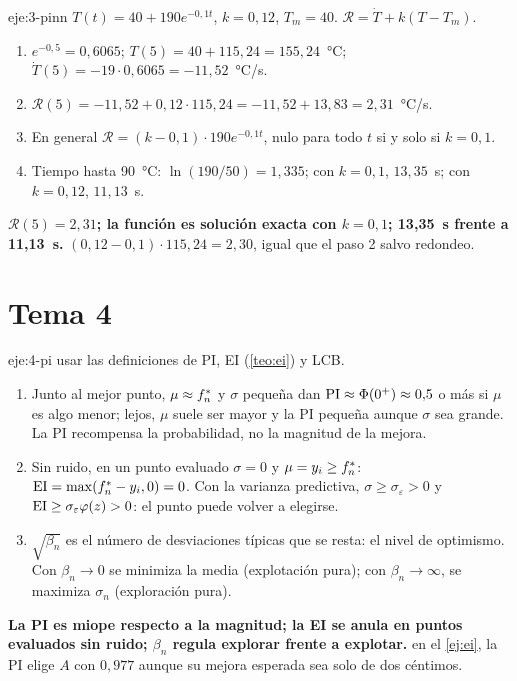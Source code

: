 \begin{solucion}{eje:3-pinn}
\datos $T(t)=40+190e^{-0{,}1t}$, $k=0{,}12$, $T_m=40$.
\planteamiento $\mathcal R=\dot T+k(T-T_m)$.
\pasos
\begin{enumerate}[label=\arabic*.]
  \item $e^{-0{,}5}=0{,}6065$; $T(5)=40+115{,}24=155{,}24$~°C; $\dot T(5)=-19\cdot0{,}6065=-11{,}52$~°C/s.
  \item $\mathcal R(5)=-11{,}52+0{,}12\cdot115{,}24=-11{,}52+13{,}83=2{,}31$~°C/s.
  \item En general $\mathcal R=(k-0{,}1)\cdot190e^{-0{,}1t}$, nulo para todo $t$ si y solo si $k=0{,}1$.
  \item Tiempo hasta 90~°C: $\ln(190/50)=1{,}335$; con $k=0{,}1$, $13{,}35$~s; con $k=0{,}12$, $11{,}13$~s.
\end{enumerate}
\resultado \textbf{$\mathcal R(5)=2{,}31$; la función es solución exacta con $k=0{,}1$; 13,35~s frente a 11,13~s.}
\comprobacion $(0{,}12-0{,}1)\cdot115{,}24=2{,}30$, igual que el paso 2 salvo redondeo.
\end{solucion}

\section{Tema 4}

\begin{solucion}{eje:4-pi}
\planteamiento usar las definiciones de PI, EI (\cref{teo:ei}) y LCB.
\pasos
\begin{enumerate}[label=(\alph*)]
  \item Junto al mejor punto, $\mu\approx f^{*}_{n}$ y $\sigma$ pequeña dan $\operatorname{PI}\approx\Phi(0^+)\approx0{,}5$ o más si $\mu$ es algo menor; lejos, $\mu$ suele ser mayor y la PI pequeña aunque $\sigma$ sea grande. La PI recompensa la probabilidad, no la magnitud de la mejora.
  \item Sin ruido, en un punto evaluado $\sigma=0$ y $\mu=y_i\ge f^{*}_{n}$: $\operatorname{EI}=\max(f^{*}_{n}-y_i,0)=0$. Con la varianza predictiva, $\sigma\ge\sigma_\varepsilon>0$ y $\operatorname{EI}\ge\sigma_\varepsilon\varphi(z)>0$: el punto puede volver a elegirse.
  \item $\sqrt{\beta_n}$ es el número de desviaciones típicas que se resta: el nivel de optimismo. Con $\beta_n\to0$ se minimiza la media (explotación pura); con $\beta_n\to\infty$, se maximiza $\sigma_n$ (exploración pura).
\end{enumerate}
\resultado \textbf{La PI es miope respecto a la magnitud; la EI se anula en puntos evaluados sin ruido; $\beta_n$ regula explorar frente a explotar.}
\comprobacion en el \cref{ej:ei}, la PI elige $A$ con $0{,}977$ aunque su mejora esperada sea solo de dos céntimos.
\end{solucion}

